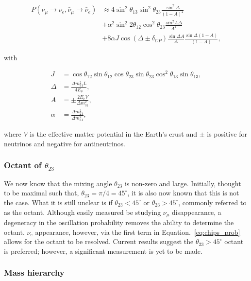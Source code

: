 \begin{align} %
    P(\nu_{\mu}\rightarrow\nu_{e},\bar{\nu}_{\mu}\rightarrow\bar{\nu}_{e})
     & \approx4\sin^{2}\theta_{13}\sin^{2}\theta_{23}\frac{\sin^{2}\Delta}{(1-A)^{2}} \nonumber  \\
     & + \alpha^{2}\sin^{2}2\theta_{12}\cos^{2}\theta_{23}\frac{sin^{2}A\Delta}{A^{2}} \nonumber \\
     & + 8\alpha J\cos(\Delta\pm\delta_{CP})\frac{\sin\Delta A}{A}\frac{\sin\Delta(1-A)}{(1-A)},
    \label{eq:chips_prob}
\end{align}

with

\begin{align} %
    J      & = \cos\theta_{12}\sin\theta_{12}\cos\theta_{23}
    \sin\theta_{23}\cos^{2}\theta_{13}\sin\theta_{13},       \\
    \Delta & = \frac{\Delta m^{2}_{31}L}{4E_{\nu}},          \\
    A      & = \pm\frac{2E_{\nu}V}{\Delta m^{2}_{31}},       \\
    \alpha & = \frac{\Delta m^{2}_{21}}{\Delta m^{2}_{31}},
    \label{eq:chips_prob_parts}
\end{align}

where $V$ is the effective matter potential in the Earth's crust and $\pm$ is positive for
neutrinos and negative for antineutrinos.

\subsubsection*{Octant of $\theta_{23}$} %

We now know that the mixing angle $\theta_{23}$ is non-zero and large. Initially, thought to be
maximal such that, $\theta_{23}=\pi/4=45^{\circ}$, it is also now known that this is not the case.
What it is still unclear is if $\theta_{23}<45^{\circ}$ or $\theta_{23}>45^{\circ}$, commonly
referred to as the octant. Although easily measured be studying $\nu_{\mu}$ disappearance, a
degeneracy in the oscillation probability removes the ability to determine the octant. $\nu_{e}$
appearance, however, via the first term in Equation.~\ref{eq:chips_prob} allows for the octant to
be resolved. Current results suggest the $\theta_{23}>45^{\circ}$ octant is preferred; however, a
significant measurement is yet to be made.

\subsubsection*{Mass hierarchy} %

